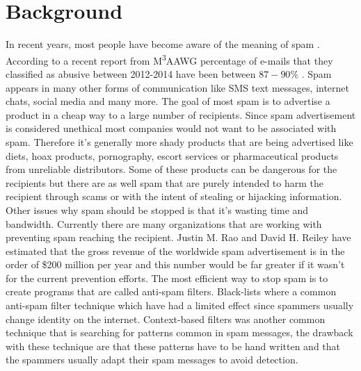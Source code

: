 \section{Background}
In recent years, most people have become aware of the meaning of spam .
According to a recent report from M\textsuperscript{3}AAWG percentage of
e-mails that they
classified as abusive between 2012-2014 have been between $87-90\%$
\cite{M3AAWG2014}. Spam appears in many other forms of communication like SMS
text messages, internet chats, social media and many more.
The goal of most spam is to advertise a product in a cheap way to a large
number of recipients. Since spam advertisement is considered unethical most
companies would not want to be associated with spam. Therefore it's generally
more shady products that are being advertised like diets, hoax products,
pornography, escort services or pharmaceutical products from unreliable
distributors. Some of these products can be dangerous for the recipients but
there are as well spam that are purely intended to harm the recipient through
scams or with the intent of stealing or hijacking information.
Other issues why spam should be stopped is that it's wasting time and
bandwidth. Currently there are many organizations that are working with
preventing spam reaching the recipient.  Justin M. Rao and David H. Reiley
\cite{rao2012economics} have estimated that the gross revenue of the worldwide
spam advertisement is in the order of \$200 million per year and this number
would be far greater if it wasn't for the current prevention efforts.
The most efficient way to stop spam is to create programs that are called
anti-spam filters. Black-lists where a common anti-spam filter technique which
have had a limited effect since spammers usually change identity on the
internet. Context-based filters was another common technique that is searching
for patterns common in spam messages, the drawback with these technique are
that these patterns have to be hand written and that the spammers usually adapt
their spam messages to avoid detection. 
